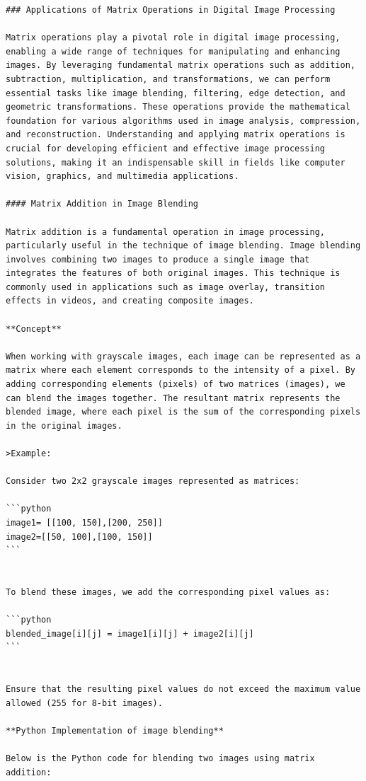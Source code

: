 \documentclass[
  letterpaper,
  DIV=11,
  numbers=noendperiod]{scrreprt}
\theoremstyle{plain}
\theoremstyle{definition}
\theoremstyle{remark}
\begin{document}
\begin{verbatim}
### Applications of Matrix Operations in Digital Image Processing

Matrix operations play a pivotal role in digital image processing, enabling a wide range of techniques for manipulating and enhancing images. By leveraging fundamental matrix operations such as addition, subtraction, multiplication, and transformations, we can perform essential tasks like image blending, filtering, edge detection, and geometric transformations. These operations provide the mathematical foundation for various algorithms used in image analysis, compression, and reconstruction. Understanding and applying matrix operations is crucial for developing efficient and effective image processing solutions, making it an indispensable skill in fields like computer vision, graphics, and multimedia applications.

#### Matrix Addition in Image Blending

Matrix addition is a fundamental operation in image processing, particularly useful in the technique of image blending. Image blending involves combining two images to produce a single image that integrates the features of both original images. This technique is commonly used in applications such as image overlay, transition effects in videos, and creating composite images.

**Concept**

When working with grayscale images, each image can be represented as a matrix where each element corresponds to the intensity of a pixel. By adding corresponding elements (pixels) of two matrices (images), we can blend the images together. The resultant matrix represents the blended image, where each pixel is the sum of the corresponding pixels in the original images.

>Example:

Consider two 2x2 grayscale images represented as matrices:

```python
image1= [[100, 150],[200, 250]]
image2=[[50, 100],[100, 150]]
```


To blend these images, we add the corresponding pixel values as:

```python
blended_image[i][j] = image1[i][j] + image2[i][j]
```


Ensure that the resulting pixel values do not exceed the maximum value allowed (255 for 8-bit images).

**Python Implementation of image blending**

Below is the Python code for blending two images using matrix addition:


\end{verbatim}
\end{document}
